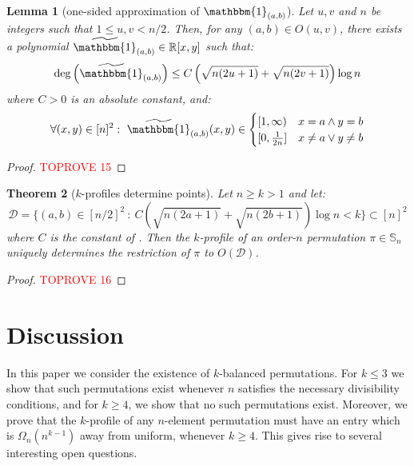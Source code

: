 \documentclass{article}
\newtheorem{theorem}{Theorem}[section]
\newtheorem{lemma}[theorem]{Lemma}
\newcommand{\Sn}{\mathbb{S}_n}
\newcommand{\RR}{\mathbb{R}}
\theoremstyle{remark}
\theoremstyle{plain}
\begin{document}
\begin{lemma}[one-sided approximation of $\mathbbm{1}_{(a,b)}$]
\label{lemma:approx_ind}
Let $u,v$ and $n$ be integers such that $1 \le u,v < n/2$. Then, for any $(a,b) \in O(u,v)$, there exists a polynomial $\widetilde{\mathbbm{1}}_{(a,b)} \in \RR[x,y]$ such that:
\[
    \deg \left(\widetilde{\mathbbm{1}}_{(a,b)}\right) \le C \left( \sqrt{n(2u+1)} + \sqrt{n(2v+1)}\right) \log n
\]
where $C > 0$ is an absolute constant, and:
\[
    \forall (x,y) \in [n]^2:\ \widetilde{\mathbbm{1}}_{(a,b)}(x,y) \in \begin{cases}
        [1, \infty) & x=a \land y=b \\
        [0, \frac{1}{2n}] & x \ne a \lor y \ne b
    \end{cases}
\]
\end{lemma}
\begin{proof}\textcolor{red}{TOPROVE 15}\end{proof}

\begin{theorem}[$k$-profiles determine points]
    \label{thm:prof_to_points}
    Let $n \ge k > 1$ and let:
    \[
        \mathcal{D} = \Big\{ (a,b) \in \left[ n/2 \right]^2\ :\ C \left( \sqrt{n(2a+1)} + \sqrt{n(2b+1)}\right) \log n < k \Big\} \subset [n]^2
    \]
    where $C$ is the constant of .
    Then the $k$-profile of an order-$n$ permutation $\pi \in \Sn$ uniquely determines the restriction of $\pi$ to $O(\mathcal{D})$. 
\end{theorem}
\begin{proof}\textcolor{red}{TOPROVE 16}\end{proof}
 \section{Discussion}
\label{sect:discussion}

In this paper we consider the existence of $k$-balanced permutations.
For $k \le 3$ we show that such permutations exist whenever $n$ satisfies the necessary divisibility conditions,
and for $k \ge 4$, we show that no such permutations exist.
Moreover, we prove that the $k$-profile of any $n$-element permutation must have an entry
which is $\Omega_n(n^{k-1})$ away from uniform, whenever $k \ge 4$.
This gives rise to several interesting open questions.
\end{document}
